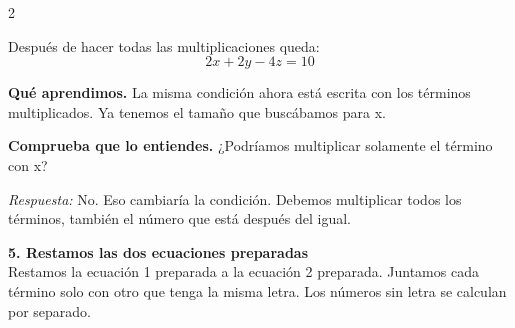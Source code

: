\documentclass[11pt,a4paper,landscape]{article}
\begin{document}
\begin{multicols*}{2}
\begin{minipage}{\linewidth}
\par{}\par\smallskip
\par\smallskip Después de hacer todas las multiplicaciones queda:
\[2x + 2y - 4z = 10\]
\par\smallskip\textbf{Qué aprendimos.} La misma condición ahora está escrita con los términos multiplicados. Ya tenemos el tamaño que buscábamos para x.
\par\smallskip\textbf{Comprueba que lo entiendes.} ¿Podríamos multiplicar solamente el término con x?\par\textit{Respuesta:} No. Eso cambiaría la condición. Debemos multiplicar todos los términos, también el número que está después del igual.
\end{minipage}\par\medskip
\noindent\begin{minipage}{\linewidth}\textbf{5. Restamos las dos ecuaciones preparadas}\\[2pt]Restamos la ecuación 1 preparada a la ecuación 2 preparada. Juntamos cada término solo con otro que tenga la misma letra. Los números sin letra se calculan por separado.
\par{}\par\smallskip

\end{minipage}
\end{multicols*}
\end{document}

